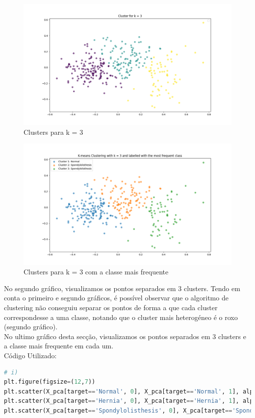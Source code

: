 \documentclass[a4paper,12pt]{article} %
\begin{document}
\begin{enumerate}
\begin{figure}[H]
    \centering
    \includegraphics[width=0.8\linewidth]{ex3_cluster.png}
    \captionsetup{font=small} 
    \caption{Clusters para k = 3}
\end{figure}

\begin{figure}[H]
    \centering
    \includegraphics[width=0.8\linewidth]{ex3_cluster_labelled.png}
    \captionsetup{font=small} 
    \caption{Clusters para k = 3 com a classe mais frequente}
\end{figure}

No segundo gráfico, visualizamos os pontos separados em 3 clusters. Tendo em conta o primeiro e segundo gráficos, é possível observar que o algoritmo de clustering não conseguiu separar os pontos de forma a que cada cluster correspondesse a uma classe, notando que o cluster mais heterogéneo é o roxo (segundo gráfico). \\
No ultimo gráfico desta secção, visualizamos os pontos separados em 3 clusters e a classe mais frequente em cada um. \\

Código Utilizado: 

\begin{lstlisting}[language=Python]
# i)
plt.figure(figsize=(12,7))
plt.scatter(X_pca[target=='Normal', 0], X_pca[target=='Normal', 1], alpha=0.6, label='Normal')
plt.scatter(X_pca[target=='Hernia', 0], X_pca[target=='Hernia', 1], alpha=0.6, label='Hernia')
plt.scatter(X_pca[target=='Spondylolisthesis', 0], X_pca[target=='Spondylolisthesis', 1], alpha=0.6, label='Spondylolisthesis')


\end{lstlisting}
\end{enumerate}
\end{document}
